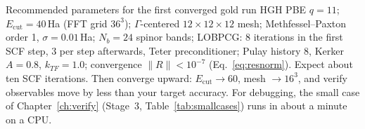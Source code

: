 \begin{keybox}{Recommended parameters for the first converged gold run}
HGH PBE $q{=}11$; $E_{\mathrm{cut}} = 40$\,Ha (FFT grid $36^3$);
$\Gamma$-centered $12{\times}12{\times}12$ mesh; Methfessel--Paxton
order 1, $\sigma = 0.01$\,Ha; $N_b = 24$ spinor bands; LOBPCG: 8
iterations in the first SCF step, 3 per step afterwards, Teter
preconditioner; Pulay history 8, Kerker $A = 0.8$, $k_{TF} = 1.0$;
convergence $\|R\| < 10^{-7}$ (Eq.~\eqref{eq:resnorm}). Expect about ten
SCF iterations. Then converge upward: $E_{\mathrm{cut}} \to 60$, mesh
$\to 16^3$, and verify observables move by less than your target
accuracy. For debugging, the small case of Chapter~\ref{ch:verify}
(Stage~3, Table~\ref{tab:smallcases}) runs in about a minute on a CPU.
\end{keybox}
